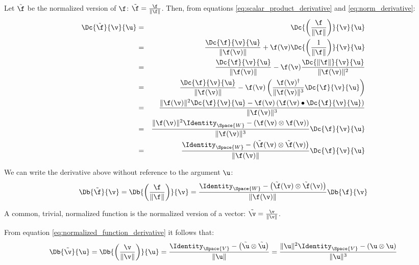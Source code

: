 Let $\tilde{\f}$ be the normalized version of $\f$:
$\tilde{\f}  =  \frac{\f}{\| \f \|}$.
Then, from equations \ref{eq:scalar_product_derivative}
and \ref{eq:norm_derivative}:
\begin{eqnarray}
\Dc{\tilde{\f}}{\v}{\u}
& = &
\Dc{\left( \frac{\f}{\| \f \|}\right)}{\v}{\u}
\\
& = &
\frac{\Dc{\f}{\v}{\u}}{ \| \f(\v) \|}
 +
\f(\v)  \Dc{ \left( \frac{1}{\| \f \|} \right) }{\v}{\u} \nonumber \\
& = &
\frac{\Dc{\f}{\v}{\u}}
{\| \f(\v) \|}
 -
\f(\v)
\frac{\Dc{\| \f \|}{\v}{\u}}
{\|\f(\v)\|^2} \nonumber \\
& = &
\frac{\Dc{\f}{\v}{\u}}{ \| \f(\v) \| }
 -
\f(\v) \left( \frac{\f(\v)^\dagger}{\| \f(\v) \|^3}  \Dc{\f}{\v}{\u} \right) \nonumber \\
& = &
\frac{
\| \f(\v) \|^2 \Dc{\f}{\v}{\u}
 -
\f(\v)\left( \f(\v) \bullet \Dc{\f}{\v}{\u} \right)
}
{\| \f(\v) \|^3}  \nonumber \\
& = &
\frac{\| \f(\v) \|^2 \Identity_{\Space{W}} - \left( \f(\v) \otimes \f(\v) \right)  }
{ \| \f(\v) \|^3 }
\Dc{\f}{\v}{\u} \nonumber \\
& = &
\frac{\Identity_{\Space{W}} - \left( \tilde{\f}(\v) \otimes \tilde{\f}(\v) \right)  }
{\| \f(\v) \|}
\Dc{\f}{\v}{\u} \nonumber
\end{eqnarray}


We can write the derivative above without reference to the argument $\u$:
\begin{equation}
\label{eq:normalized_function_derivative}
\Db{\tilde{\f}}{\v}
 =
\Db{\left( \frac{\f}{\| \f \|} \right)}{\v}
 =
\frac{\Identity_{\Space{W}} - \left( \tilde{\f}(\v) \otimes \tilde{\f}(\v) \right) }
{ \| \f(\v) \| }
\Db{\f}{\v}
\end{equation}

A common, trivial, normalized function is the normalized version of
a vector: $\tilde{\v} =  \frac{\v}{ \| \v \| }$.

From equation \ref{eq:normalized_function_derivative}
it follows that:
\begin{equation}
\label{eq:normalized_vector_derivative}
\Db{\tilde{\v}}{\u}
 =
\Db{ \left( \frac{\v}{ \| \v \| } \right) }{\u}
 =
\frac{\Identity_{\Space{V}} - \left( \tilde{\u} \otimes \tilde{\u} \right) }
{ \| \u \| }
 =
\frac{\| \u \|^2 \Identity_{\Space{V}} - \left( \u \otimes \u \right) }
{\| \u \|^3}
\end{equation}

\label{sec:derivatives-of-real-valued-functions}

